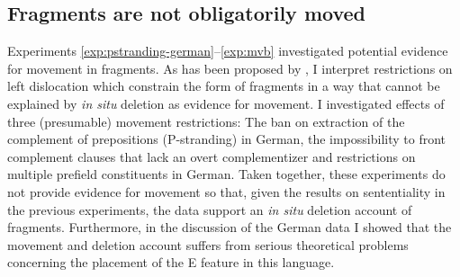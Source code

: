 \subsection{Fragments are not obligatorily moved}
Experiments \ref{exp:pstranding-german}--\ref{exp:mvb} investigated potential evidence for movement in fragments. As has been proposed by \citet{merchant2004}, I interpret restrictions on left dislocation which constrain the form of fragments in a way that cannot be explained by \textit{in situ} deletion as evidence for movement. I investigated effects of three (presumable) movement restrictions: The ban on extraction of the complement of prepositions (P-stranding) in German, the impossibility to front complement clauses that lack an overt complementizer and restrictions on multiple prefield constituents in German. Taken together, these experiments do not provide evidence for movement so that, given the results on sententiality in the previous experiments, the data support an \textit{in situ} deletion account of fragments. Furthermore, in the discussion of the German data I showed that the movement and deletion account suffers from serious theoretical problems concerning the placement of the E feature in this language.

